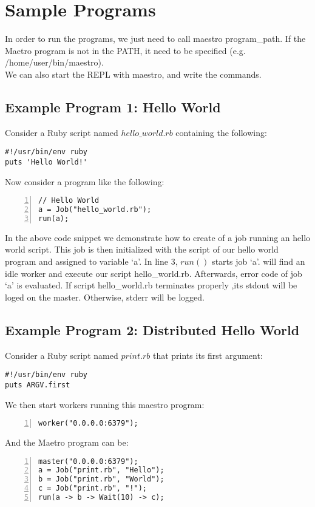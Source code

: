 \section{Sample Programs}
\label{sect:samples}
In order to run the programs, we just need to call maestro program\_path. If the Maetro
program is not in the PATH, it need to be specified (e.g. /home/user/bin/maestro).\\
We can also start the REPL with maestro, and write the commands.

\subsection*{Example Program 1: Hello World}
Consider a Ruby script named $hello\_world.rb$ containing the following:
\begin{verbatim}
#!/usr/bin/env ruby
puts 'Hello World!'
\end{verbatim}
Now consider a \lang{} program like the following:
\begin{Verbatim}[numbers=left]
// Hello World
a = Job("hello_world.rb");
run(a);
\end{Verbatim}

In the above code snippet we demonstrate how to create of a job running an hello world script.
This job is then initialized with the script of our hello world program and
assigned to variable `a'. In line 3, $run()$ starts job `a'. 
\lang{} will find an idle worker and execute our script hello\_world.rb.
Afterwards, error code of job `a' is evaluated. If script hello\_world.rb terminates properly
,its stdout will be loged on the master. Otherwise, stderr will be logged.

\subsection*{Example Program 2: Distributed Hello World}
Consider a Ruby script named $print.rb$ that prints its first argument:
\begin{verbatim}
#!/usr/bin/env ruby
puts ARGV.first
\end{verbatim}
We then start workers running this maestro program:
\begin{Verbatim}[numbers=left]
worker("0.0.0.0:6379");
\end{Verbatim}
And the Maetro program can be:
\begin{Verbatim}[numbers=left]
master("0.0.0.0:6379");
a = Job("print.rb", "Hello");
b = Job("print.rb", "World");
c = Job("print.rb", "!");
run(a -> b -> Wait(10) -> c);
\end{Verbatim}

